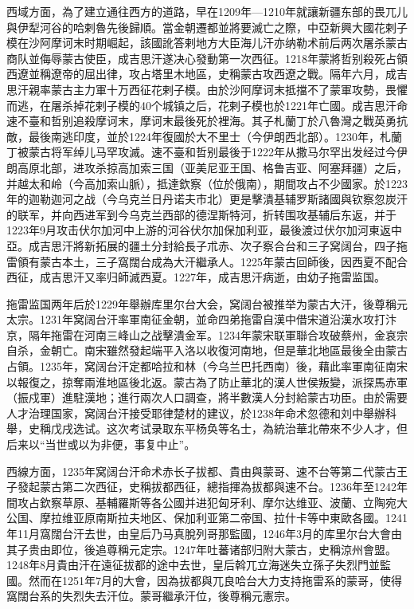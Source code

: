 西域方面，為了建立通往西方的道路，早在1209年—1210年就讓新疆东部的畏兀儿與伊犁河谷的哈剌魯先後歸順。當金朝遷都並將要滅亡之際，中亞新興大國花剌子模在沙阿摩诃末时期崛起，該國訛答剌地方大臣海儿汗亦纳勒术前后两次屠杀蒙古商队並侮辱蒙古使臣，成吉思汗遂决心發動第一次西征。1218年蒙將哲别殺死占領西遼並稱遼帝的屈出律，攻占塔里木地區，史稱蒙古攻西遼之戰。隔年六月，成吉思汗親率蒙古主力軍十万西征花剌子模。由於沙阿摩诃末抵擋不了蒙軍攻勢，畏懼而逃，在屠杀掉花剌子模的40个城镇之后，花剌子模也於1221年亡國。成吉思汗命速不臺和哲别追殺摩诃末，摩诃末最後死於裡海。其子札蘭丁於八魯灣之戰英勇抗敵，最後南逃印度，並於1224年復國於大不里士（今伊朗西北部）。1230年，札蘭丁被蒙古将军绰儿马罕攻滅。速不臺和哲别最後于1222年从撒马尔罕出发经过今伊朗高原北部，进攻杀掠高加索三国（亚美尼亚王国、格鲁吉亚、阿塞拜疆）之后，并越太和岭（今高加索山脈），抵達欽察（位於俄南），期間攻占不少國家。於1223年的迦勒迦河之战（今乌克兰日丹诺夫市北）更是擊潰基辅罗斯諸國與钦察忽炭汗的联军，并向西进军到今乌克兰西部的德涅斯特河，折转围攻基辅后东返，并于1223年9月攻击伏尔加河中上游的河谷伏尔加保加利亚，最後渡过伏尔加河東返中亞。成吉思汗將新拓展的疆土分封給長子朮赤、次子察合台和三子窝阔台，四子拖雷領有蒙古本土，三子窩闊台成為大汗繼承人。1225年蒙古回師後，因西夏不配合西征，成吉思汗又率归師滅西夏。1227年，成吉思汗病逝，由幼子拖雷监国。

拖雷监国两年后於1229年舉辦库里尔台大会，窝阔台被推举为蒙古大汗，後尊稱元太宗。1231年窝阔台汗率軍南征金朝，並命四弟拖雷自漢中借宋道沿漢水攻打汴京，隔年拖雷在河南三峰山之战擊潰金军。1234年蒙宋联軍聯合攻破蔡州，金哀宗自杀，金朝亡。南宋雖然發起端平入洛以收復河南地，但是華北地區最後全由蒙古占領。1235年，窝阔台汗定都哈拉和林（今乌兰巴托西南）後，藉此率軍南征南宋以報復之，掠奪兩淮地區後北返。蒙古為了防止華北的漢人世侯叛變，派探馬赤軍（振戍軍）進駐漢地；進行兩次人口調查，將半數漢人分封給蒙古功臣。由於需要人才治理国家，窝阔台汗接受耶律楚材的建议，於1238年命术忽德和刘中舉辦科舉，史稱戊戌选试。这次考试录取东平杨奂等名士，為統治華北帶來不少人才，但后来以“当世或以为非便，事复中止”。

西線方面，1235年窝阔台汗命术赤长子拔都、貴由與蒙哥、速不台等第二代蒙古王子發起蒙古第二次西征，史稱拔都西征，總指揮為拔都與速不台。1236年至1242年間攻占欽察草原、基輔羅斯等各公國并进犯匈牙利、摩尔达维亚、波蘭、立陶宛大公国、摩拉维亚原南斯拉夫地区、保加利亚第二帝国、拉什卡等中東歐各國。1241年11月窩闊台汗去世，由皇后乃马真脫列哥那監國，1246年3月的库里尔台大會由其子贵由即位，後追尊稱元定宗。1247年吐蕃诸部归附大蒙古，史稱涼州會盟。1248年8月貴由汗在遠征拔都的途中去世，皇后斡兀立海迷失立孫子失烈門並監國。然而在1251年7月的大會，因為拔都與兀良哈台大力支持拖雷系的蒙哥，使得窩闊台系的失烈失去汗位。蒙哥繼承汗位，後尊稱元憲宗。

